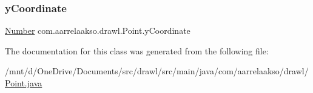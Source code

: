 \mbox{\label{classcom_1_1aarrelaakso_1_1drawl_1_1_point_ab84afea50a66677c32ed2fd3100838c7}} 
\subsubsection{\texorpdfstring{y\+Coordinate}{yCoordinate}}
{\footnotesize\ttfamily \hyperlink{interfacecom_1_1aarrelaakso_1_1drawl_1_1_number}{Number} com.\+aarrelaakso.\+drawl.\+Point.\+y\+Coordinate\hspace{0.3cm}{\ttfamily [private]}}



The documentation for this class was generated from the following file\+:\begin{DoxyCompactItemize}
\item 
/mnt/d/\+One\+Drive/\+Documents/src/drawl/src/main/java/com/aarrelaakso/drawl/\hyperlink{_point_8java}{Point.\+java}\end{DoxyCompactItemize}
